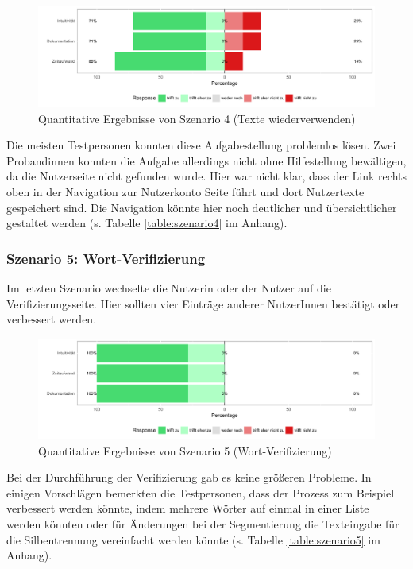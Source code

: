 \begin{figure}[h!]
	\centering
	\includegraphics[width=.8\linewidth]{figures/evaluation/scenario4}
	\caption{Quantitative Ergebnisse von Szenario 4 (Texte wiederverwenden)}
	\label{fig:evaluation-sc4}
\end{figure}

Die meisten Testpersonen konnten diese Aufgabestellung problemlos lösen. Zwei Probandinnen konnten die Aufgabe allerdings nicht ohne Hilfestellung bewältigen, da die Nutzerseite nicht gefunden wurde. Hier war nicht klar, dass der Link rechts oben in der Navigation zur Nutzerkonto Seite führt und dort Nutzertexte gespeichert sind. Die Navigation könnte hier noch deutlicher und übersichtlicher gestaltet werden (s. Tabelle \ref{table:szenario4} im Anhang).

\subsubsection{Szenario 5: Wort-Verifizierung}

Im letzten Szenario wechselte die Nutzerin oder der Nutzer auf die Verifizierungsseite. Hier sollten vier Einträge anderer NutzerInnen bestätigt oder verbessert werden.

\begin{figure}[h!]
	\centering
	\includegraphics[width=.8\linewidth]{figures/evaluation/scenario5}
	\caption{Quantitative Ergebnisse von Szenario 5 (Wort-Verifizierung)}
	\label{fig:evaluation-sc5}
\end{figure}

Bei der Durchführung der Verifizierung gab es keine größeren Probleme. In einigen Vorschlägen bemerkten die Testpersonen, dass der Prozess zum Beispiel verbessert werden könnte, indem mehrere Wörter auf einmal in einer Liste  werden könnten oder für Änderungen bei der Segmentierung die Texteingabe für die Silbentrennung vereinfacht werden könnte (s. Tabelle \ref{table:szenario5} im Anhang).

